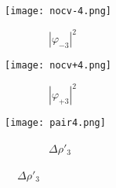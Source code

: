 \documentclass[journal=inoraj,manuscript=article]{achemso}
\begin{document}
\begin{figure}
    \vspace{0.0cm}
    \begin{subfigure}[t]{0.32\textwidth}
        \centering
        \texttt{[image: nocv-4.png]} 
        \caption*{\ \ \ \ \ \ \ \ $|\varphi_{-3}|^2$} 
    \end{subfigure}
    \hfill
    \begin{subfigure}[t]{0.32\textwidth}
        \centering
        \texttt{[image: nocv+4.png]} 
        \caption*{\ \ \ \ \ \ \ \ $|\varphi_{+3}|^2$} 
    \end{subfigure}
    \hfill
    \begin{subfigure}[t]{0.32\textwidth}
        \centering
        \texttt{[image: pair4.png]} 
        \caption*{\ \ \ \ \ \ \ \ $\Delta \rho'_3$} 
    \end{subfigure}

\end{figure}
\end{document}

